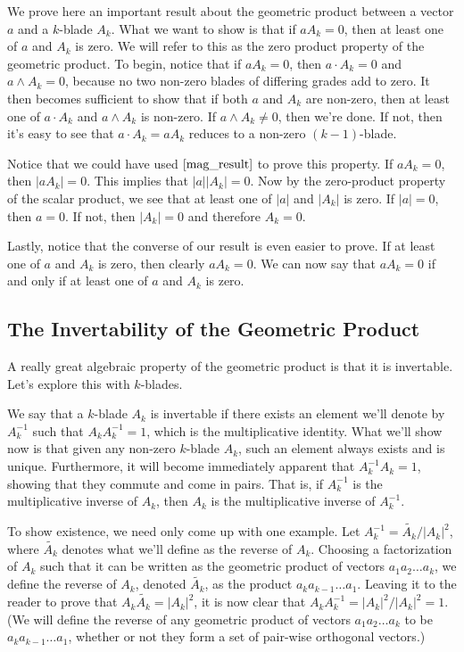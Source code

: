 \documentclass{article}
\begin{document}
We prove here an important
result about the geometric product between a vector $a$
and a $k$-blade $A_k$.  What we want to show is that
if $aA_k=0$, then at least one of $a$ and $A_k$ is zero.
We will refer to this as the zero product property of
the geometric product.
To begin, notice that if $aA_k=0$, then
$a\cdot A_k=0$ and $a\wedge A_k=0$, because
no two non-zero blades of differing grades add to zero.
It then becomes sufficient to show that if both
$a$ and $A_k$ are non-zero, then at least one
of $a\cdot A_k$ and $a\wedge A_k$ is non-zero.
If $a\wedge A_k\neq 0$, then we're done.
If not, then it's easy to see that
$a\cdot A_k=aA_k$ reduces to a non-zero $(k-1)$-blade.

Notice that we could have used $\eqref{mag_result}$
to prove this property.  If $aA_k=0$, then $|aA_k|=0$.
This implies that $|a||A_k|=0$.  Now by the zero-product
property of the scalar product, we see that at least
one of $|a|$ and $|A_k|$ is zero.  If $|a|=0$, then
$a=0$.  If not, then $|A_k|=0$ and therefore $A_k=0$.

Lastly, notice that the converse of our result is even
easier to prove.  If at least one of $a$ and $A_k$ is
zero, then clearly $aA_k=0$.  We can now say that
$aA_k=0$ if and only if at least one of $a$ and $A_k$
is zero.

\subsection{The Invertability of the Geometric Product}

A really great algebraic property of the geometric product
is that it is invertable.  Let's explore this with $k$-blades.

We say that a $k$-blade $A_k$ is invertable if there exists
an element we'll denote by $A_k^{-1}$ such that
$A_kA_k^{-1}=1$, which is the multiplicative identity.
What we'll show now is that given any non-zero $k$-blade $A_k$,
such an element always exists and is unique.  Furthermore,
it will become immediately apparent that
$A_k^{-1}A_k=1$, showing that they commute and come in pairs.
That is, if $A_k^{-1}$ is the multiplicative inverse of $A_k$,
then $A_k$ is the multiplicative inverse of $A_k^{-1}$.

To show existence, we need only come up with one example.
Let $A_k^{-1}=\tilde{A_k}/|A_k|^2$, where $\tilde{A_k}$
denotes what we'll define as the reverse of $A_k$.
Choosing a factorization of $A_k$ such that it can
be written as the geometric product of vectors $a_1a_2\dots a_k$,
we define the reverse of $A_k$, denoted $\tilde{A_k}$, as
the product $a_ka_{k-1}\dots a_1$.  Leaving it to the reader
to prove that $A_k\tilde{A_k}=|A_k|^2$, it is now clear
that $A_kA_k^{-1}=|A_k|^2/|A_k|^2=1$.  (We will
define the reverse of any geometric product of vectors $a_1a_2\dots a_k$
to be $a_ka_{k-1}\dots a_1$, whether or not they form a set of pair-wise
orthogonal vectors.)
\end{document}
